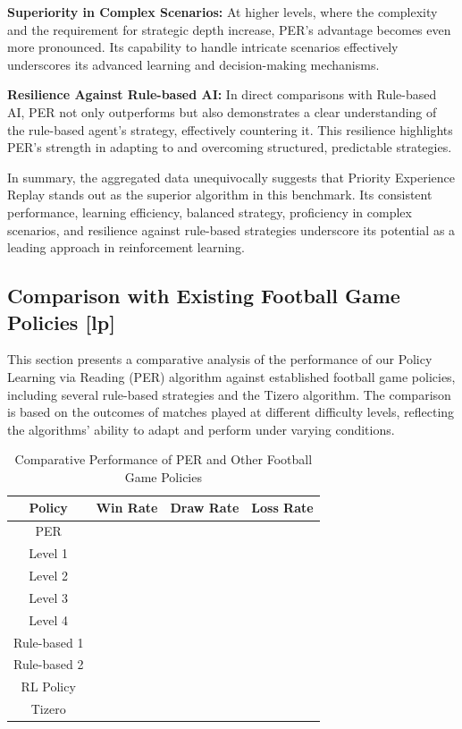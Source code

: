 \textbf{Superiority in Complex Scenarios:} At higher levels, where the complexity and the requirement for strategic depth increase, PER's advantage becomes even more pronounced. Its capability to handle intricate scenarios effectively underscores its advanced learning and decision-making mechanisms.

\textbf{Resilience Against Rule-based AI:} In direct comparisons with Rule-based AI, PER not only outperforms but also demonstrates a clear understanding of the rule-based agent's strategy, effectively countering it. This resilience highlights PER's strength in adapting to and overcoming structured, predictable strategies.

In summary, the aggregated data unequivocally suggests that Priority Experience Replay stands out as the superior algorithm in this benchmark. Its consistent performance, learning efficiency, balanced strategy, proficiency in complex scenarios, and resilience against rule-based strategies underscore its potential as a leading approach in reinforcement learning.


\subsection{Comparison with Existing Football Game Policies  [lp]}

This section presents a comparative analysis of the performance of our Policy Learning via Reading (PER) algorithm against established football game policies, including several rule-based strategies and the Tizero algorithm. The comparison is based on the outcomes of matches played at different difficulty levels, reflecting the algorithms' ability to adapt and perform under varying conditions.

\begin{table}[h]
\centering
\begin{tabular}{c|c|c|c}
\toprule
Policy & Win Rate & Draw Rate & Loss Rate \\
\midrule
PER & & & \\
Level 1 & & & \\
Level 2  & & & \\
Level 3 & & & \\
Level 4 & & & \\
Rule-based 1 & & & \\
Rule-based 2 & & & \\
RL Policy & & & \\
\midrule
\midrule
Tizero & & & \\
\bottomrule
\end{tabular}
\caption{Comparative Performance of PER and Other Football Game Policies}
\label{tab:football_game_policies_comparison}
\end{table}


